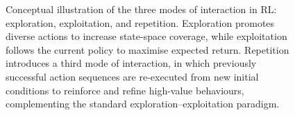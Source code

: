\begin{figure}[!t]
{
}
\caption[Exploration, exploitation, and repetition in RL]{
Conceptual illustration of the three modes of interaction in RL: exploration, exploitation, and repetition. Exploration promotes diverse actions to increase state-space coverage, while exploitation follows the current policy to maximise expected return. Repetition introduces a third mode of interaction, in which previously successful action sequences are re-executed from new initial conditions to reinforce and refine high-value behaviours, complementing the standard exploration–exploitation paradigm.
}
\label{fig:exploration-exploitation-repetition}
\end{figure}







